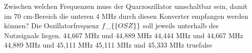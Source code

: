     {Zwischen welchen Frequenzen muss der Quarzoszillator umschaltbar sein, damit im 70 cm-Bereich die unteren 4 MHz durch diesen Konverter empfangen werden können? Die Oszillatorfrequenz $f\_\{\textrm\{OSZ\}\}$ soll jeweils unterhalb des Nutzsignals liegen.}
    {44,667 MHz und 44,889 MHz}
    {44,444 MHz und 
44,667 MHz}
    {44,889 MHz und 45,111 MHz}
    {45,111 MHz und 45,333 MHz}
    {true}{false}